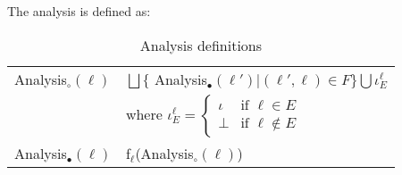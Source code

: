 \noindent The analysis is defined as:
\begin{table}[H]
\begin{tabular}{| l | l |}
  \hline
  Analysis$_\circ(\ell)$ & $ \bigsqcup \{$ Analysis$_\bullet (\ell') | (\ell', \ell) \in F \} \bigcup \iota_E^{\ell} $ \\
                         & where $\iota_E^{\ell} = \begin{cases} \iota & \text{if } \ell \in E \\ 
                                                                 \bot  & \text{if } \ell \notin E
                                                   \end{cases}$\\
  \hline
  Analysis$_\bullet(\ell)$ & f$_\ell$(Analysis$_\circ(\ell)$)\\
  \hline
\end{tabular}
\centering
\caption{Analysis definitions}
\end{table}

